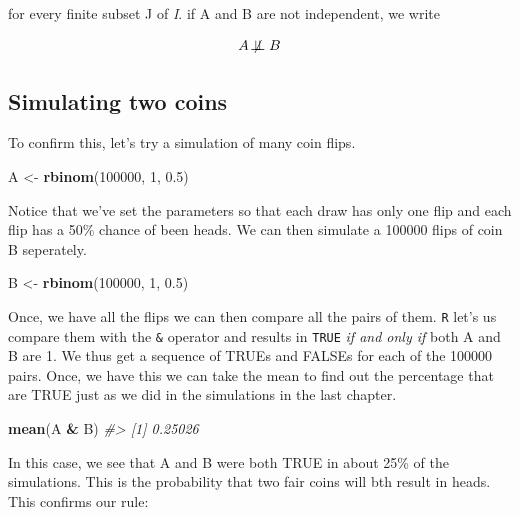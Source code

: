 \documentclass[]{article}
\newenvironment{Shaded}{\begin{snugshade}}{\end{snugshade}}
\newcommand{\CommentTok}[1]{\textcolor[rgb]{0.56,0.35,0.01}{\textit{#1}}}
\newcommand{\DecValTok}[1]{\textcolor[rgb]{0.00,0.00,0.81}{#1}}
\newcommand{\FloatTok}[1]{\textcolor[rgb]{0.00,0.00,0.81}{#1}}
\newcommand{\KeywordTok}[1]{\textcolor[rgb]{0.13,0.29,0.53}{\textbf{#1}}}
\newcommand{\NormalTok}[1]{#1}
\newcommand{\OperatorTok}[1]{\textcolor[rgb]{0.81,0.36,0.00}{\textbf{#1}}}
\newcommand{\StringTok}[1]{\textcolor[rgb]{0.31,0.60,0.02}{#1}}
\begin{document}
for every finite subset J of \emph{I}. if A and B are not independent,
we write

\[A \not\!\perp\!\!\!\perp B\]

\hypertarget{simulating-two-coins}{%
\subsection{Simulating two coins}\label{simulating-two-coins}}

To confirm this, let's try a simulation of many coin flips.

\begin{Shaded}
\begin{Highlighting}[]
\NormalTok{A <-}\StringTok{ }\KeywordTok{rbinom}\NormalTok{(}\DecValTok{100000}\NormalTok{, }\DecValTok{1}\NormalTok{, }\FloatTok{0.5}\NormalTok{)}
\end{Highlighting}
\end{Shaded}

Notice that we've set the parameters so that each draw has only one flip
and each flip has a 50\% chance of been heads. We can then simulate a
100000 flips of coin B seperately.

\begin{Shaded}
\begin{Highlighting}[]
\NormalTok{B <-}\StringTok{ }\KeywordTok{rbinom}\NormalTok{(}\DecValTok{100000}\NormalTok{, }\DecValTok{1}\NormalTok{, }\FloatTok{0.5}\NormalTok{)}
\end{Highlighting}
\end{Shaded}

Once, we have all the flips we can then compare all the pairs of them.
\texttt{R} let's us compare them with the \texttt{\&} operator and
results in \texttt{TRUE} \emph{if and only if} both A and B are 1. We
thus get a sequence of TRUEs and FALSEs for each of the 100000 pairs.
Once, we have this we can take the mean to find out the percentage that
are TRUE just as we did in the simulations in the last chapter.

\begin{Shaded}
\begin{Highlighting}[]
\KeywordTok{mean}\NormalTok{(A }\OperatorTok{&}\StringTok{ }\NormalTok{B)}
\CommentTok{#> [1] 0.25026}
\end{Highlighting}
\end{Shaded}

In this case, we see that A and B were both TRUE in about 25\% of the
simulations. This is the probability that two fair coins will bth result
in heads. This confirms our rule:
\end{document}
